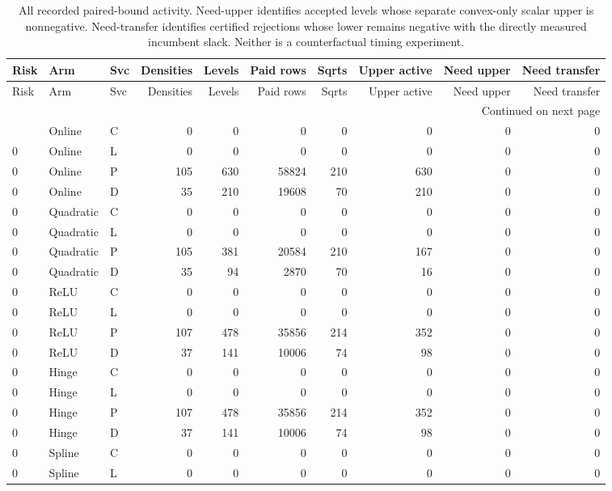 \begingroup
\scriptsize
\setlength{\tabcolsep}{3pt}
\begin{longtable}{lllrrrrrrr}
\caption{All recorded paired-bound activity. Need-upper identifies accepted levels whose separate convex-only scalar upper is nonnegative. Need-transfer identifies certified rejections whose lower remains negative with the directly measured incumbent slack. Neither is a counterfactual timing experiment.}\label{tab:allpairuse120}\\
\toprule
Risk & Arm & Svc & Densities & Levels & Paid rows & Sqrts & Upper active & Need upper & Need transfer \\ \midrule
\endfirsthead
\toprule
Risk & Arm & Svc & Densities & Levels & Paid rows & Sqrts & Upper active & Need upper & Need transfer \\ \midrule
\endhead
\midrule\multicolumn{10}{r}{Continued on next page}\\\endfoot
\bottomrule\endlastfoot
0 & Online & C & 0 & 0 & 0 & 0 & 0 & 0 & 0 \\
0 & Online & L & 0 & 0 & 0 & 0 & 0 & 0 & 0 \\
0 & Online & P & 105 & 630 & 58824 & 210 & 630 & 0 & 0 \\
0 & Online & D & 35 & 210 & 19608 & 70 & 210 & 0 & 0 \\
0 & Quadratic & C & 0 & 0 & 0 & 0 & 0 & 0 & 0 \\
0 & Quadratic & L & 0 & 0 & 0 & 0 & 0 & 0 & 0 \\
0 & Quadratic & P & 105 & 381 & 20584 & 210 & 167 & 0 & 0 \\
0 & Quadratic & D & 35 & 94 & 2870 & 70 & 16 & 0 & 0 \\
0 & ReLU & C & 0 & 0 & 0 & 0 & 0 & 0 & 0 \\
0 & ReLU & L & 0 & 0 & 0 & 0 & 0 & 0 & 0 \\
0 & ReLU & P & 107 & 478 & 35856 & 214 & 352 & 0 & 0 \\
0 & ReLU & D & 37 & 141 & 10006 & 74 & 98 & 0 & 0 \\
0 & Hinge & C & 0 & 0 & 0 & 0 & 0 & 0 & 0 \\
0 & Hinge & L & 0 & 0 & 0 & 0 & 0 & 0 & 0 \\
0 & Hinge & P & 107 & 478 & 35856 & 214 & 352 & 0 & 0 \\
0 & Hinge & D & 37 & 141 & 10006 & 74 & 98 & 0 & 0 \\
0 & Spline & C & 0 & 0 & 0 & 0 & 0 & 0 & 0 \\
0 & Spline & L & 0 & 0 & 0 & 0 & 0 & 0 & 0 \\

\end{longtable}
